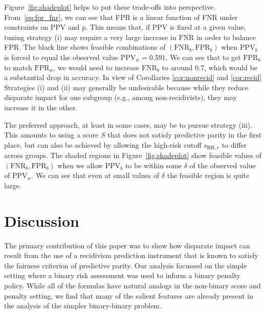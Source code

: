 \documentclass[11pt, svgnames]{article}
\newcommand{\fpr}{\mathrm{FPR}}
\newcommand{\fnr}{\mathrm{FNR}}
\numberwithin{equation}{section}
\theoremstyle{plain}
\theoremstyle{definition}
\numberwithin{prop}{section}
\numberwithin{corollary}{section}
\begin{document}
Figure~\ref{fig:shadeplot} helps to put these trade-offs into perspective.  From~\eqref{eq:fpr_fnr}, we can see that FPR is a linear function of FNR under constraints on PPV and $p$.  This means that, if PPV is fixed at a given value, tuning strategy (i) may require a very large increase in $\fnr$ in order to balance FPR.  The black line shows feasible combinations of $(\fnr_b, \fpr_b)$ when $\mathrm{PPV}_b$ is forced to equal the observed value $\mathrm{PPV}_w = 0.591$.  We can see that to get $\fpr_b$ to match  $\fpr_w$, we would need to increase $\fnr_b$ to around $0.7$, which would be a substantial drop in accuracy.  In view of Corollaries \ref{cor:nonrecid} and \ref{cor:recid} Strategies (i) and (ii) may generally be undesirable because while they reduce disparate impact for one subgroup (e.g., among non-recidivists), they may increase it in the other.  

The preferred approach, at least in some cases, may be to pursue strategy (iii).  This amounts to using a score $S$ that does not satisfy predictive parity in the first place, but can also be achieved by allowing the high-risk cutoff $s_{\mathrm{HR}, r}$ to differ across groups.  The shaded regions in Figure~\ref{fig:shadeplot} show feasible values of $(\fnr_b, \fpr_b)$ when we allow $\mathrm{PPV}_b$ to be within some  $\delta$ of the observed value of $\mathrm{PPV}_w$.  We can see that even at small values of $\delta$ the feasible region is quite large.  


\section{Discussion}

The primary contribution of this paper was to show how disparate impact can result from the use of a recidivism prediction instrument that is known to satisfy the fairness criterion of predictive parity.  Our analysis focussed on the simple setting where a binary risk assessment was used to inform a binary penalty policy.  While all of the formulas have natural analogs in the non-binary score and penalty setting, we find that many of the salient features are already present in the analysis of the simpler binary-binary problem.  
\end{document}
